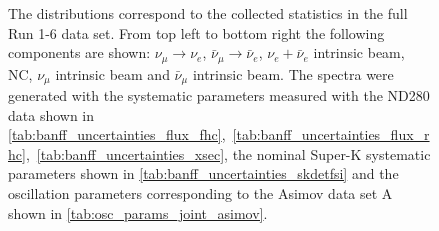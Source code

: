 \begin{figure}[htb]
{The distributions correspond to the collected statistics in the full Run 1-6 data set.
From top left to bottom right the following components are shown:
$\nu_{\mu} \rightarrow \nu_e$,
$\bar{\nu}_{\mu} \rightarrow \bar{\nu}_e$,
$\nu_e + \bar{\nu}_e$ intrinsic beam,
NC,
$\nu_{\mu}$ intrinsic beam
and
$\bar{\nu}_{\mu}$ intrinsic beam.
The spectra were generated with the systematic parameters measured with the ND280 data 
shown in \cref{tab:banff_uncertainties_flux_fhc},~\ref{tab:banff_uncertainties_flux_rhc},~\ref{tab:banff_uncertainties_xsec},
the nominal Super-K systematic parameters shown in \cref{tab:banff_uncertainties_skdetfsi}
and the oscillation parameters corresponding to the Asimov data set A shown in \cref{tab:osc_params_joint_asimov}.
}
\label{fig:joint_ereco_vs_theta_1re_data}
\end{figure}

